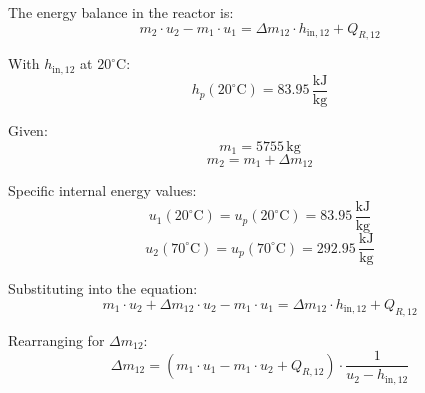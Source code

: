 The energy balance in the reactor is:  
\[
m_2 \cdot u_2 - m_1 \cdot u_1 = \Delta m_{12} \cdot h_{\text{in},12} + Q_{R,12}
\]  

With \( h_{\text{in},12} \) at \( 20^\circ\text{C} \):  
\[
h_p(20^\circ\text{C}) = 83.95 \, \frac{\text{kJ}}{\text{kg}}
\]  

Given:  
\[
m_1 = 5755 \, \text{kg}
\]  
\[
m_2 = m_1 + \Delta m_{12}
\]  

Specific internal energy values:  
\[
u_1(20^\circ\text{C}) = u_p(20^\circ\text{C}) = 83.95 \, \frac{\text{kJ}}{\text{kg}}
\]  
\[
u_2(70^\circ\text{C}) = u_p(70^\circ\text{C}) = 292.95 \, \frac{\text{kJ}}{\text{kg}}
\]  

Substituting into the equation:  
\[
m_1 \cdot u_2 + \Delta m_{12} \cdot u_2 - m_1 \cdot u_1 = \Delta m_{12} \cdot h_{\text{in},12} + Q_{R,12}
\]  

Rearranging for \( \Delta m_{12} \):  
\[
\Delta m_{12} = \left( m_1 \cdot u_1 - m_1 \cdot u_2 + Q_{R,12} \right) \cdot \frac{1}{u_2 - h_{\text{in},12}}
\]